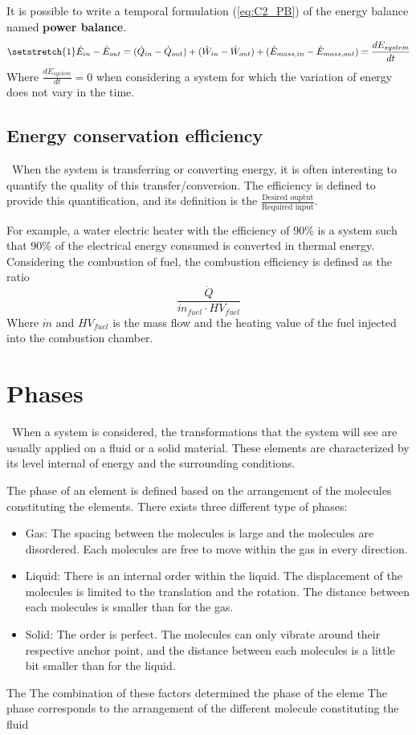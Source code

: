 It is possible to write a temporal formulation (\ref{eq:C2_PB}) of the energy balance named \textbf{power balance}.  
\begin{equation}
\setstretch{1}
    \dot{E}_{in} - \dot{E}_{out} = (\dot{Q}_{in} - \dot{Q}_{out}) + (\dot{W}_{in} - \dot{W}_{out}) + (\dot{E}_{mass,in} - \dot{E}_{mass,out}) = \frac{dE_{system}}{dt} \label{eq:C2_PB}
\end{equation}
Where $\frac{dE_{system}}{dt}=0$ when considering a system for which the variation of energy does not vary in the time.
\subsection{Energy conservation efficiency}
\quad\, When the system is transferring or converting energy, it is often interesting to quantify the quality of this transfer/conversion. The efficiency is defined to provide this quantification, and its definition is the
$\frac{\text{Desired ouptut}}{\text{Required input}}$. 

For example, a water electric heater with the efficiency of 90\% is a system such that 90\% of the electrical energy consumed is converted in thermal energy.  
Considering the combustion of fuel, the combustion efficiency is defined as the ratio
$$ \frac{\dot{Q}}{\dot{m}_{fuel}\cdot HV_{fuel}}$$
Where $\dot{m}$  and $HV_{fuel}$ is the mass flow and the heating value of the fuel injected into the combustion chamber.

\section{Phases}
\quad\ When a system is considered, the transformations that the system will see are usually applied on a fluid or a solid material. These elements are characterized by its level internal of energy and the surrounding conditions.

The phase of an element is defined based on the arrangement of the molecules constituting the elements. There exists three different type of phases:

\begin{itemize}
    \item Gas: The spacing between the molecules is large and the molecules are disordered. Each molecules are free to move within the gas in every direction.
    \item Liquid: There is an internal order within the liquid. The displacement of the molecules is limited to the translation and the rotation. The distance between each molecules is smaller than for the gas.
    \item Solid: The order is perfect. The molecules can only vibrate around their respective anchor point, and the distance between each molecules is a little bit smaller than for the liquid.
\end{itemize}

The
The combination of these factors determined the phase of the eleme The phase corresponds to the arrangement of the different molecule constituting the fluid